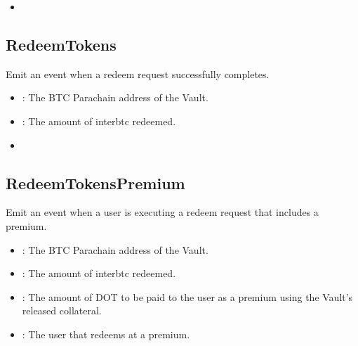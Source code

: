 \documentclass[a4paper,10pt,english]{sphinxmanual}
\begin{document}
\begin{itemize}
\item {} 
{\hyperref[\detokenize{spec/vault-registry:decreasetokens}]{}}

\end{itemize}


\subsection{RedeemTokens}
\label{\detokenize{spec/vault-registry:id48}}
Emit an event when a redeem request successfully completes.



\begin{itemize}
\item {} 
: The BTC Parachain address of the Vault.

\item {} 
: The amount of interbtc redeemed.

\end{itemize}

\begin{itemize}
\item {} 
{\hyperref[\detokenize{spec/vault-registry:redeemtokens}]{}}

\end{itemize}


\subsection{RedeemTokensPremium}
\label{\detokenize{spec/vault-registry:redeemtokenspremium}}
Emit an event when a user is executing a redeem request that includes a premium.



\begin{itemize}
\item {} 
: The BTC Parachain address of the Vault.

\item {} 
: The amount of interbtc redeemed.

\item {} 
: The amount of DOT to be paid to the user as a premium using the Vault’s released collateral.

\item {} 
: The user that redeems at a premium.

\end{itemize}
\end{document}
